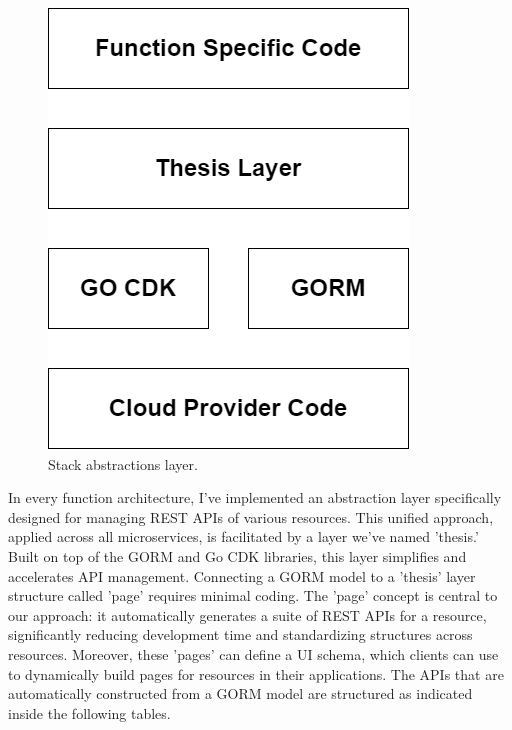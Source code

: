\begin{figure}
    \centering
    \includegraphics[scale=0.3]{Pictures/5_stack_framework.png}
    \caption{Stack abstractions layer.}
    \label{fig:5_stack_framework}
\end{figure}

In every function architecture, I've implemented an abstraction layer specifically designed for
managing REST APIs of various resources. This unified approach, applied across all microservices, is
facilitated by a layer we've named 'thesis.' Built on top of the GORM and Go CDK libraries, this
layer simplifies and accelerates API management. Connecting a GORM model to a 'thesis' layer
structure called 'page' requires minimal coding. The 'page' concept is central to our approach: it
automatically generates a suite of REST APIs for a resource, significantly reducing development time
and standardizing structures across resources. Moreover, these 'pages' can define a UI schema, which
clients can use to dynamically build pages for resources in their applications. The APIs that are
automatically constructed from a GORM model are structured as indicated inside the following tables.

